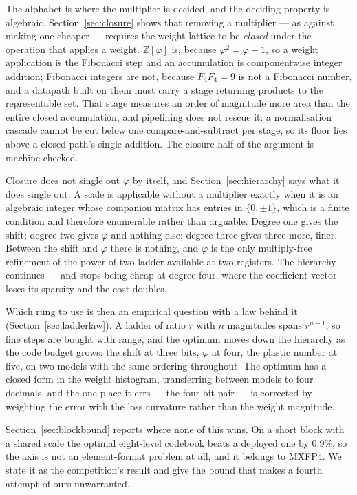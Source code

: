 \documentclass[11pt]{article}
\theoremstyle{definition}
\begin{document}
The alphabet is where the multiplier is decided, and the deciding property is
algebraic. Section~\ref{sec:closure} shows that removing a multiplier --- as
against making one cheaper --- requires the weight lattice to be \emph{closed}
under the operation that applies a weight. $\mathbb{Z}[\varphi]$ is, because
$\varphi^2=\varphi+1$, so a weight application is the Fibonacci step and an
accumulation is componentwise integer addition; Fibonacci integers are not,
because $F_4F_4=9$ is not a Fibonacci number, and a datapath built on them must
carry a stage returning products to the representable set. That stage measures
an order of magnitude more area than the entire closed accumulation, and
pipelining does not rescue it: a normalisation cascade cannot be cut below one
compare-and-subtract per stage, so its floor lies above a closed path's single
addition. The closure half of the argument is machine-checked.

Closure does not single out $\varphi$ by itself, and Section~\ref{sec:hierarchy}
says what it does single out. A scale is applicable without a multiplier exactly
when it is an algebraic integer whose companion matrix has entries in
$\{0,\pm1\}$, which is a finite condition and therefore enumerable rather than
arguable. Degree one gives the shift; degree two gives $\varphi$ and nothing
else; degree three gives three more, finer. Between the shift and $\varphi$
there is nothing, and $\varphi$ is the only multiply-free refinement of the
power-of-two ladder available at two registers. The hierarchy continues --- and
stops being cheap at degree four, where the coefficient vector loses its
sparsity and the cost doubles.

Which rung to use is then an empirical question with a law behind it
(Section~\ref{sec:ladderlaw}). A ladder of ratio $r$ with $n$ magnitudes spans
$r^{n-1}$, so fine steps are bought with range, and the optimum moves down the
hierarchy as the code budget grows: the shift at three bits, $\varphi$ at four,
the plastic number at five, on two models with the same ordering throughout. The
optimum has a closed form in the weight histogram, transferring between models
to four decimals, and the one place it errs --- the four-bit pair --- is
corrected by weighting the error with the loss curvature rather than the weight
magnitude.

Section~\ref{sec:blockbound} reports where none of this wins. On a short block
with a shared scale the optimal eight-level codebook beats a deployed one by
$0.9\%$, so the axis is not an element-format problem at all, and it belongs to
MXFP4. We state it as the competition's result and give the bound that makes a
fourth attempt of ours unwarranted.
\end{document}
